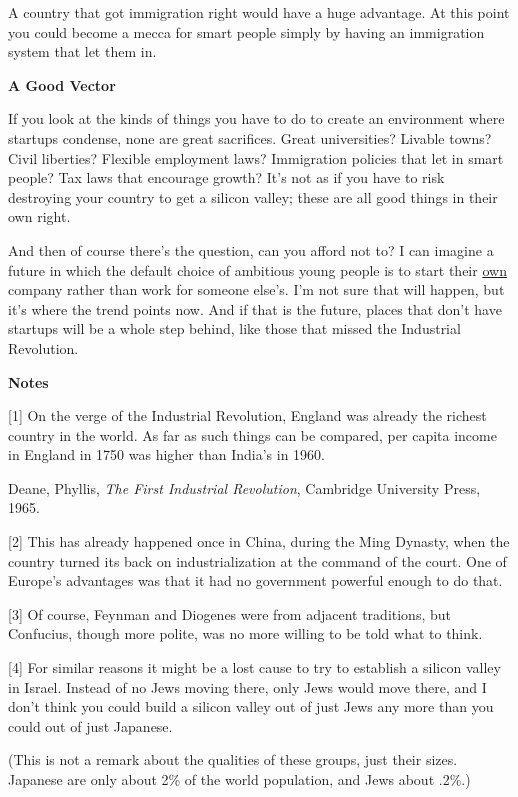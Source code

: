 A country that got immigration right would have a huge advantage. At
this point you could become a mecca for smart people simply by having an
immigration system that let them in.

\textbf{A Good Vector}

If you look at the kinds of things you have to do to create an
environment where startups condense, none are great sacrifices. Great
universities? Livable towns? Civil liberties? Flexible employment laws?
Immigration policies that let in smart people? Tax laws that encourage
growth? It's not as if you have to risk destroying your country to get a
silicon valley; these are all good things in their own right.

And then of course there's the question, can you afford not to? I can
imagine a future in which the default choice of ambitious young people
is to start their \href{hiring.html}{own} company rather than work for
someone else's. I'm not sure that will happen, but it's where the trend
points now. And if that is the future, places that don't have startups
will be a whole step behind, like those that missed the Industrial
Revolution.

\textbf{Notes}

{[}1{]} On the verge of the Industrial Revolution, England was already
the richest country in the world. As far as such things can be compared,
per capita income in England in 1750 was higher than India's in 1960.

Deane, Phyllis, \emph{The First Industrial Revolution}, Cambridge
University Press, 1965.

{[}2{]} This has already happened once in China, during the Ming
Dynasty, when the country turned its back on industrialization at the
command of the court. One of Europe's advantages was that it had no
government powerful enough to do that.

{[}3{]} Of course, Feynman and Diogenes were from adjacent traditions,
but Confucius, though more polite, was no more willing to be told what
to think.

{[}4{]} For similar reasons it might be a lost cause to try to establish
a silicon valley in Israel. Instead of no Jews moving there, only Jews
would move there, and I don't think you could build a silicon valley out
of just Jews any more than you could out of just Japanese.

(This is not a remark about the qualities of these groups, just their
sizes. Japanese are only about 2\% of the world population, and Jews
about .2\%.)

